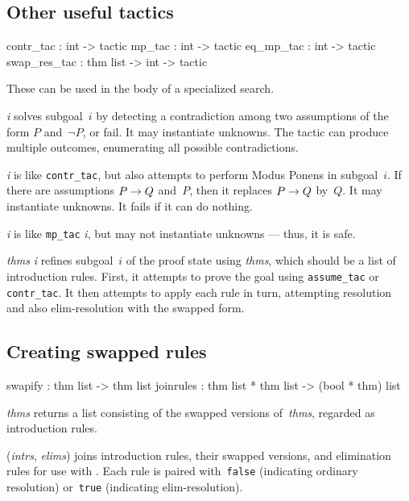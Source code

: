 \subsection{Other useful tactics}
\begin{ttbox} 
contr_tac    :             int -> tactic
mp_tac       :             int -> tactic
eq_mp_tac    :             int -> tactic
swap_res_tac : thm list -> int -> tactic
\end{ttbox}
These can be used in the body of a specialized search.
\begin{ttdescription}
\item[\ttindexbold{contr_tac} {\it i}]
  solves subgoal~$i$ by detecting a contradiction among two assumptions of
  the form $P$ and~$\neg P$, or fail.  It may instantiate unknowns.  The
  tactic can produce multiple outcomes, enumerating all possible
  contradictions.

\item[\ttindexbold{mp_tac} {\it i}] 
is like \texttt{contr_tac}, but also attempts to perform Modus Ponens in
subgoal~$i$.  If there are assumptions $P\rightarrow Q$ and~$P$, then it replaces
$P\rightarrow Q$ by~$Q$.  It may instantiate unknowns.  It fails if it can do
nothing.

\item[\ttindexbold{eq_mp_tac} {\it i}] 
is like \texttt{mp_tac} {\it i}, but may not instantiate unknowns --- thus, it
is safe.

\item[\ttindexbold{swap_res_tac} {\it thms} {\it i}] refines subgoal~$i$ of
the proof state using {\it thms}, which should be a list of introduction
rules.  First, it attempts to prove the goal using \texttt{assume_tac} or
\texttt{contr_tac}.  It then attempts to apply each rule in turn, attempting
resolution and also elim-resolution with the swapped form.
\end{ttdescription}

\subsection{Creating swapped rules}
\begin{ttbox} 
swapify   : thm list -> thm list
joinrules : thm list * thm list -> (bool * thm) list
\end{ttbox}
\begin{ttdescription}
\item[\ttindexbold{swapify} {\it thms}] returns a list consisting of the
swapped versions of~{\it thms}, regarded as introduction rules.

\item[\ttindexbold{joinrules} ({\it intrs}, {\it elims})]
joins introduction rules, their swapped versions, and elimination rules for
use with .  Each rule is paired with~\texttt{false}
(indicating ordinary resolution) or~\texttt{true} (indicating
elim-resolution).
\end{ttdescription}


